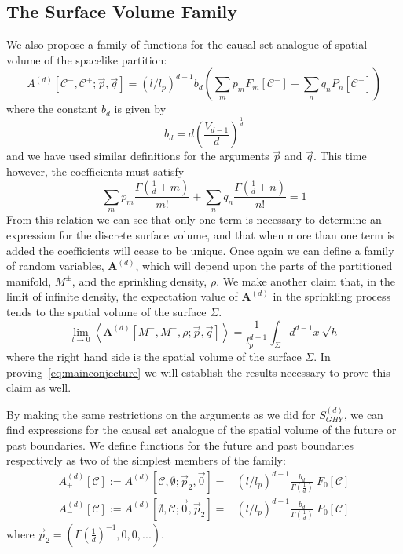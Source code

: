 \documentclass[12pt]{article}
\newcommand{\be}{\begin{equation}}
\newcommand{\ee}{\end{equation}}
\newcommand{\F}[1]{F_{#1}}
\renewcommand{\P}[1]{P_{#1}}
\begin{document}
\subsection{The Surface Volume Family}

We also propose a family of functions for the causal set analogue of spatial volume of the spacelike partition:
\be\label{general_area_sum}
A^{ (d)}[\mathcal{C}^-,\mathcal{C}^+;\vec{p},\vec{q}]=\left (l/l_p\right)^{d-1}b_{d}\left (\sum_m p_m \F{m}\left[\mathcal{C}^- \right] + \sum_n q_n \P{n}\left[\mathcal{C}^+ \right]\right)
\ee
where the constant $b_d$ is given by
\be\label{constant_b_d}
b_d=d\left(\frac{V_{d-1}}{d}\right)^{\frac{1}{d}}
\ee
and we have used similar definitions for the arguments $\vec{p}$ and $\vec{q}$. This time however, the coefficients must satisfy 
\be\label{area_coefficient_relation}
\sum_m p_m \frac{\Gamma\left (\frac{1}{d}+m \right)}{m!}  + \sum_n q_n\frac{\Gamma\left (\frac{1}{d}+n \right)}{n!}=1
\ee
From this relation we can see that only one term is necessary to determine an expression for the discrete surface volume, and that when more than one term is added the coefficients will cease to be unique. Once again we can define a family of random variables, $\textbf{A}^{ (d)}$, which will depend upon the parts of the partitioned manifold, $M^{\pm}$, and the sprinkling density, $\rho$. We make another claim that, in the limit of infinite density, the expectation value of $\textbf{A}^{ (d)}$ in the sprinkling process tends to the spatial volume of the surface $\Sigma$.
\be\label{eq:conjecture_for_area}
\lim_{l\rightarrow0}\left\langle\textbf{A}^{ (d)}[M^-,M^+,\rho;\vec{p} , \vec{q}]\right\rangle= \frac{1}{l_p^{d-1}}\int_{\Sigma} d^{d-1}x\: \sqrt{h}
\ee
where the right hand side is the spatial volume of the surface $\Sigma$. In proving~\eqref{eq:mainconjecture} we will establish the results necessary to prove this claim as well.

By making the same restrictions on the arguments as we did for $S^{ (d)}_{GHY}$, we can find expressions for the causal set analogue of the spatial volume of the future or past boundaries. We define functions for the future and past boundaries respectively as two of the simplest members of the family:
\begin{align}\label{eq:future_past_spatial_volume}
A^{ (d)}_{+}[\mathcal{C}]:=A^{ (d)}[\mathcal{C},\emptyset;\vec{p}_2,\vec{0}]= & \left (l/l_p\right)^{d-1}\frac{b_{d}}{\Gamma\left (\frac{1}{d}\right)}\: \F{0}[\mathcal{C}]
\\
A^{ (d)}_{-}[\mathcal{C}]:=A^{ (d)}[\emptyset,\mathcal{C};\vec{0},\vec{p}_2]= & \left (l/l_p\right)^{d-1}\frac{b_{d}}{\Gamma\left (\frac{1}{d}\right)}\: \P{0}[\mathcal{C}]
\end{align}
where $\vec{p}_2= (\Gamma\left (\frac{1}{d}\right)^{-1},0,0,...)$.
\end{document}
